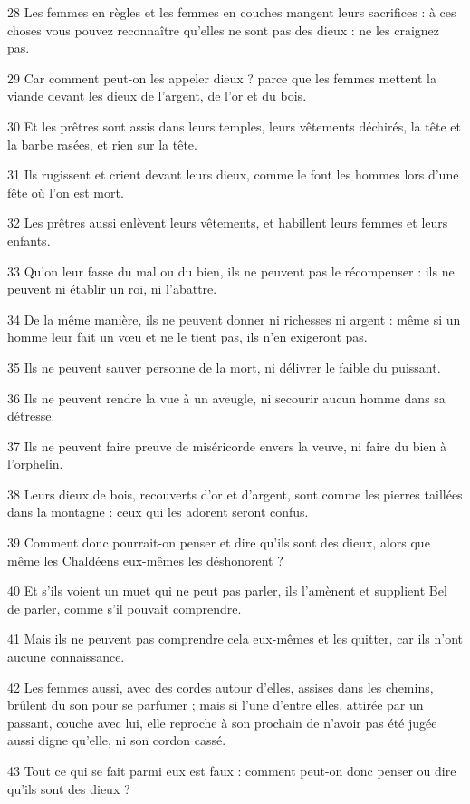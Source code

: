 \par 28 Les femmes en règles et les femmes en couches mangent leurs sacrifices : à ces choses vous pouvez reconnaître qu'elles ne sont pas des dieux : ne les craignez pas.
\par 29 Car comment peut-on les appeler dieux ? parce que les femmes mettent la viande devant les dieux de l'argent, de l'or et du bois.
\par 30 Et les prêtres sont assis dans leurs temples, leurs vêtements déchirés, la tête et la barbe rasées, et rien sur la tête.
\par 31 Ils rugissent et crient devant leurs dieux, comme le font les hommes lors d'une fête où l'on est mort.
\par 32 Les prêtres aussi enlèvent leurs vêtements, et habillent leurs femmes et leurs enfants.
\par 33 Qu'on leur fasse du mal ou du bien, ils ne peuvent pas le récompenser : ils ne peuvent ni établir un roi, ni l'abattre.
\par 34 De la même manière, ils ne peuvent donner ni richesses ni argent : même si un homme leur fait un vœu et ne le tient pas, ils n'en exigeront pas.
\par 35 Ils ne peuvent sauver personne de la mort, ni délivrer le faible du puissant.
\par 36 Ils ne peuvent rendre la vue à un aveugle, ni secourir aucun homme dans sa détresse.
\par 37 Ils ne peuvent faire preuve de miséricorde envers la veuve, ni faire du bien à l'orphelin.
\par 38 Leurs dieux de bois, recouverts d'or et d'argent, sont comme les pierres taillées dans la montagne : ceux qui les adorent seront confus.
\par 39 Comment donc pourrait-on penser et dire qu'ils sont des dieux, alors que même les Chaldéens eux-mêmes les déshonorent ?
\par 40 Et s'ils voient un muet qui ne peut pas parler, ils l'amènent et supplient Bel de parler, comme s'il pouvait comprendre.
\par 41 Mais ils ne peuvent pas comprendre cela eux-mêmes et les quitter, car ils n'ont aucune connaissance.
\par 42 Les femmes aussi, avec des cordes autour d'elles, assises dans les chemins, brûlent du son pour se parfumer ; mais si l'une d'entre elles, attirée par un passant, couche avec lui, elle reproche à son prochain de n'avoir pas été jugée aussi digne qu'elle, ni son cordon cassé.
\par 43 Tout ce qui se fait parmi eux est faux : comment peut-on donc penser ou dire qu'ils sont des dieux ?
